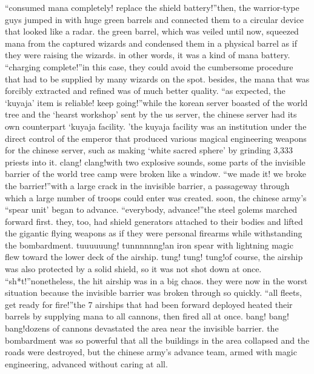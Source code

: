 “consumed mana completely! replace the shield battery!”then, the warrior-type guys jumped in with huge green barrels and connected them to a circular device that looked like a radar.
 the green barrel, which was veiled until now, squeezed mana from the captured wizards and condensed them in a physical barrel as if they were raising the wizards.
 in other words, it was a kind of mana battery.
“charging complete!”in this case, they could avoid the cumbersome procedure that had to be supplied by many wizards on the spot.
 besides, the mana that was forcibly extracted and refined was of much better quality.
“as expected, the ‘kuyaja’ item is reliable! keep going!”while the korean server boasted of the world tree and the ‘hearst workshop’ sent by the us server, the chinese server had its own counterpart ‘kuyaja facility.
’the kuyaja facility was an institution under the direct control of the emperor that produced various magical engineering weapons for the chinese server, such as making ‘white sacred sphere’ by grinding 3,333 priests into it.
clang! clang!with two explosive sounds, some parts of the invisible barrier of the world tree camp were broken like a window.
“we made it! we broke the barrier!”with a large crack in the invisible barrier, a passageway through which a large number of troops could enter was created.
 soon, the chinese army’s “spear unit’ began to advance.
“everybody, advance!”the steel golems marched forward first.
 they, too, had shield generators attached to their bodies and lifted the gigantic flying weapons as if they were personal firearms while withstanding the bombardment.
tuuuuuung! tunnnnnng!an iron spear with lightning magic flew toward the lower deck of the airship.
tung! tung! tung!of course, the airship was also protected by a solid shield, so it was not shot down at once.
“sh*t!”nonetheless, the hit airship was in a big chaos.
 they were now in the worst situation because the invisible barrier was broken through so quickly.
“all fleets, get ready for fire!”the 7 airships that had been forward deployed heated their barrels by supplying mana to all cannons, then fired all at once.
bang! bang! bang!dozens of cannons devastated the area near the invisible barrier.
the bombardment was so powerful that all the buildings in the area collapsed and the roads were destroyed, but the chinese army’s advance team, armed with magic engineering, advanced without caring at all.


